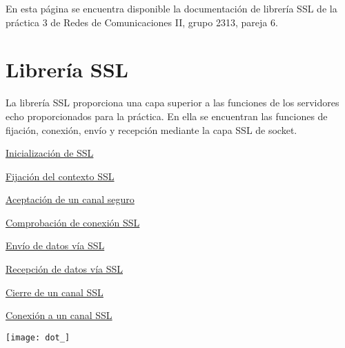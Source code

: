 En esta página se encuentra disponible la documentación de librería S\+SL de la práctica 3 de Redes de Comunicaciones II, grupo 2313, pareja 6.

\section*{Librería S\+SL}

La librería S\+SL proporciona una capa superior a las funciones de los servidores echo proporcionados para la práctica. En ella se encuentran las funciones de fijación, conexión, envío y recepción mediante la capa S\+SL de socket. 
\begin{DoxyItemize}
\item \hyperlink{inicializar_nivel_SSL}{Inicialización de S\+SL} 
\item \hyperlink{fijar_contexto_SSL}{Fijación del contexto S\+SL} 
\item \hyperlink{aceptar_canal_seguro_SSL}{Aceptación de un canal seguro} 
\item \hyperlink{evaluar_post_connectar_SSL}{Comprobación de conexión S\+SL} 
\item \hyperlink{enviar_datos_SSL}{Envío de datos vía S\+SL} 
\item \hyperlink{recibir_datos_SSL}{Recepción de datos vía S\+SL} 
\item \hyperlink{cerrar_canal_SSL}{Cierre de un canal S\+SL} 
\item \hyperlink{conectar_canal_seguro_SSL}{Conexión a un canal S\+SL} 
\end{DoxyItemize}
\begin{DoxyImageNoCaption}
  \mbox{\texttt{[image: dot\_]}}
\end{DoxyImageNoCaption}
 
